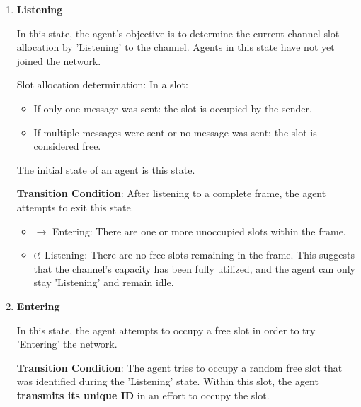 \begin{enumerate}
    \item \textbf{Listening}
    

    In this state, the agent's objective is to determine the current channel slot allocation by 'Listening' to the channel. 
    Agents in this state have not yet joined the network.

    Slot allocation determination: In a slot:
    \begin{itemize}
        \item If only one message was sent: the slot is occupied by the sender.
        \item If multiple messages were sent or no message was sent: the slot is considered free.
    \end{itemize}

    The initial state of an agent is this state.

    \textbf{Transition Condition}: After listening to a complete frame, the agent attempts to exit this state.
    \begin{itemize}
        \item $\rightarrow$ Entering: There are one or more unoccupied slots within the frame.
        \item $\circlearrowleft$ Listening: There are no free slots remaining in the frame. This suggests that the channel's capacity has been fully utilized, and the agent can only stay 'Listening' and remain idle.
    \end{itemize}
    
    \item \textbf{Entering}
    
    In this state, the agent attempts to occupy a free slot in order to try 'Entering' the network.

    \textbf{Transition Condition}: 
    The agent tries to occupy a random free slot that was identified during the 'Listening' state. 
    Within this slot, the agent \textbf{transmits its unique ID} in an effort to occupy the slot.


\end{enumerate}
